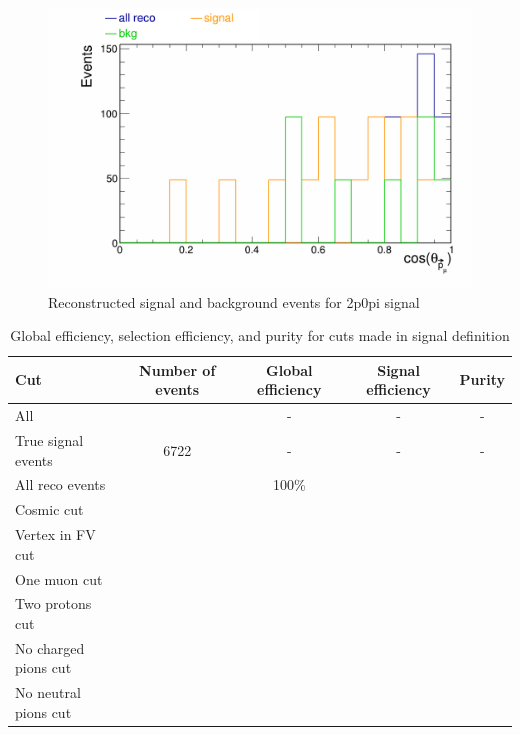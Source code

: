 \documentclass{article}
\begin{document}
\begin{figure}
    \centering
    \includegraphics[width=5in]{Figs/CAFAna/MuonCosTheta.png}
    \caption{Reconstructed signal and background events for 2p0pi signal}
    \label{fig:truth-match-signal-def}
\end{figure}

\begin{table}
    \begin{center}
        \begin{tabular}{|l|cccc|}
        \hline
        \textbf{Cut}         & \textbf{Number of events} & \textbf{Global efficiency} & \textbf{Signal efficiency} & \textbf{Purity} \\ \hline
        All                  &         & -     &  -    & -  \\
        True signal events   & 6722    & -     &  -    & -  \\
        All reco events      &         & 100\% &       &    \\
        Cosmic cut           &         &       &       &    \\
        Vertex in FV cut     & & & & \\
        One muon cut         & & & & \\
        Two protons cut      & & & & \\
        No charged pions cut & & & & \\
        No neutral pions cut & & & & \\ \hline
        \end{tabular}
    \end{center}
    \caption{Global efficiency, selection efficiency, and purity for cuts made in signal definition}
    \label{table:cut-efficiency-purity}
\end{table}
\end{document}
